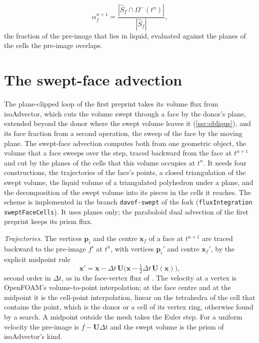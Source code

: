 \documentclass[preprint,12pt]{elsarticle}
\newcommand{\x}{\mathbf{x}}
\newcommand{\Sfhat}{\hat{S}_f}
\begin{document}
\begin{equation}
\alpha_f^{n+1} = \frac{|\Sfhat \cap \Omega^-(t^n)|}{|\Sfhat|},
\label{eq:face-update}
\end{equation}
the fraction of the pre-image that lies in liquid, evaluated against the planes of the cells the pre-image overlaps.

\section{The swept-face advection}
\label{sec:method}



The plane-clipped loop of the first preprint takes its volume flux from isoAdvector, which cuts the volume swept through a face by the donor's plane, extended beyond the donor where the swept volume leaves it (\cref{sec:oblique}), and its face fraction from a second operation, the sweep of the face by the moving plane. The swept-face advection computes both from one geometric object, the volume that a face sweeps over the step, traced backward from the face at $t^{n+1}$ and cut by the planes of the cells that this volume occupies at $t^n$. It needs four constructions, the trajectories of the face's points, a closed triangulation of the swept volume, the liquid volume of a triangulated polyhedron under a plane, and the decomposition of the swept volume into its pieces in the cells it reaches. The scheme is implemented in the branch \texttt{davof-swept} of the fork \citep{TwoPhaseFlowFork2026} (\texttt{fluxIntegration sweptFaceCells}). It uses planes only; the paraboloid dual advection of the first preprint keeps its prism flux.

\emph{Trajectories.} The vertices $\mathbf{p}_i$ and the centre $\x_f$ of a face at $t^{n+1}$ are traced backward to the pre-image $f'$ at $t^n$, with vertices $\mathbf{p}_i'$ and centre $\x_f'$, by the explicit midpoint rule
\begin{equation}
\x' = \x - \Delta t\,\mathbf{U}\big(\x - \tfrac12\Delta t\,\mathbf{U}(\x)\big),
\label{eq:swept-trace}
\end{equation}
second order in $\Delta t$, as in the face-vertex flux of \citet{MaricMarschallBothe2018}. The velocity at a vertex is OpenFOAM's volume-to-point interpolation; at the face centre and at the midpoint it is the cell-point interpolation, linear on the tetrahedra of the cell that contains the point, which is the donor or a cell of its vertex ring, otherwise found by a search. A midpoint outside the mesh takes the Euler step. For a uniform velocity the pre-image is $f - \mathbf{U}\Delta t$ and the swept volume is the prism of isoAdvector's kind.
\end{document}
